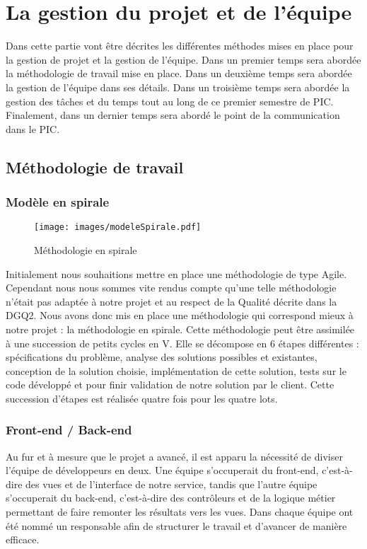 \documentclass[asi]{picInsa}
\begin{document}
\chapter{La gestion du projet et de l'équipe}
\label{gestion_equipe}
Dans cette partie vont être décrites les différentes méthodes mises en place pour la gestion de projet et la gestion de l'équipe. Dans un premier temps sera abordée la méthodologie de travail mise en place. Dans un deuxième temps sera abordée la gestion de l'équipe dans ses détails. Dans un troisième temps sera abordée la gestion des tâches et du temps tout au long de ce premier semestre de PIC. Finalement, dans un dernier temps sera abordé le point de la communication dans le PIC.

\section{Méthodologie de travail}
\subsection{Modèle en spirale}
\begin{figure}[!h]
	\begin{center}
	\texttt{[image: images/modeleSpirale.pdf]}
	\label{diagrammeSpirale}
	\caption{Méthodologie en spirale}
	\end{center}
\end{figure}

Initialement nous souhaitions mettre en place une méthodologie de type Agile. Cependant nous nous sommes vite rendus compte qu'une telle méthodologie n'était pas adaptée à notre projet et au respect de la Qualité décrite dans la DGQ2. Nous avons donc mis en place une méthodologie qui correspond mieux à notre projet : la méthodologie en spirale. Cette méthodologie peut être assimilée à une succession de petits cycles en V. Elle se décompose en 6 étapes différentes : spécifications du problème, analyse des solutions possibles et existantes, conception de la solution choisie, implémentation de cette solution, tests sur le code développé et pour finir validation de notre solution par le client. Cette succession d'étapes est réalisée quatre fois pour les quatre lots.

\subsection{Front-end / Back-end}
Au fur et à mesure que le projet a avancé, il est apparu la nécessité de diviser l'équipe de développeurs en deux. Une équipe s'occuperait du front-end, c'est-à-dire des vues et de l'interface de notre service, tandis que l'autre équipe s'occuperait du back-end, c'est-à-dire des contrôleurs et de la logique métier permettant de faire remonter les résultats vers les vues. Dans chaque équipe ont été nommé un responsable afin de structurer le travail et d'avancer de manière efficace.
\end{document}
